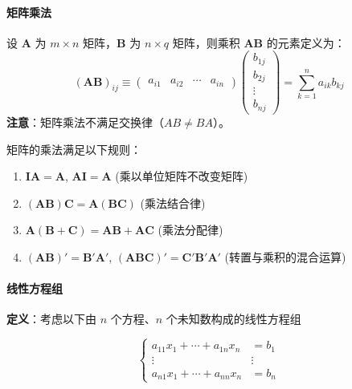 \paragraph*{矩阵乘法}
设 \( \mathbf{A} \) 为 \( m \times n \) 矩阵，\( \mathbf{B} \) 为 \( n \times q \) 矩阵，则乘积 \( \mathbf{AB} \) 的元素定义为：
\begin{equation}
	(\mathbf{AB})_{ij} \equiv 
	\begin{pmatrix}
		a_{i1} & a_{i2} & \cdots & a_{in}
	\end{pmatrix}
	\begin{pmatrix}
		b_{1j} \\
		b_{2j} \\
		\vdots \\
		b_{nj}
	\end{pmatrix}
	=
	\sum_{k=1}^{n} a_{ik} b_{kj}
\end{equation}
\textbf{注意}：矩阵乘法不满足交换律（$ AB \neq BA $）。

\begin{flushleft}
	矩阵的乘法满足以下规则：
\end{flushleft}

\begin{enumerate}
	\item $\mathbf{IA} = \mathbf{A}$, $\mathbf{AI} = \mathbf{A}$ \hfill (乘以单位矩阵不改变矩阵)
	\item $(\mathbf{AB})\mathbf{C} = \mathbf{A}(\mathbf{BC})$ \hfill (乘法结合律)
	\item $\mathbf{A}(\mathbf{B}+\mathbf{C}) = \mathbf{AB} + \mathbf{AC}$ \hfill (乘法分配律)
	\item $(\mathbf{AB})' = \mathbf{B}'\mathbf{A}'$, $(\mathbf{ABC})' = \mathbf{C}'\mathbf{B}'\mathbf{A}'$ \hfill (转置与乘积的混合运算)
\end{enumerate}

\paragraph*{线性方程组}

\begin{flushleft}
	\textbf{定义}：考虑以下由 $n$ 个方程、$n$ 个未知数构成的线性方程组
\end{flushleft}

\vspace{-0.5em}
\begin{equation}
	\left\{
	\begin{aligned}
		a_{11}x_1 + \cdots + a_{1n}x_n &= b_1 \\
		\vdots\quad\ \ &\vdots \\
		a_{n1}x_1 + \cdots + a_{nn}x_n &= b_n
	\end{aligned}
	\right.
\end{equation}


